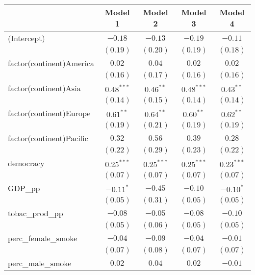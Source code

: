 
\begin{table}[!h]
\begin{center}
\begin{tabular}{l c c c c }
\toprule
 & Model 1 & Model 2 & Model 3 & Model 4 \\
\midrule
(Intercept)              & $-0.18$      & $-0.13$      & $-0.19$      & $-0.11$      \\
                         & $(0.19)$     & $(0.20)$     & $(0.19)$     & $(0.18)$     \\
factor(continent)America & $0.02$       & $0.04$       & $0.02$       & $0.02$       \\
                         & $(0.16)$     & $(0.17)$     & $(0.16)$     & $(0.16)$     \\
factor(continent)Asia    & $0.48^{***}$ & $0.46^{**}$  & $0.48^{***}$ & $0.43^{**}$  \\
                         & $(0.14)$     & $(0.15)$     & $(0.14)$     & $(0.14)$     \\
factor(continent)Europe  & $0.61^{**}$  & $0.64^{**}$  & $0.60^{**}$  & $0.62^{**}$  \\
                         & $(0.19)$     & $(0.21)$     & $(0.19)$     & $(0.19)$     \\
factor(continent)Pacific & $0.32$       & $0.56$       & $0.39$       & $0.28$       \\
                         & $(0.22)$     & $(0.29)$     & $(0.23)$     & $(0.22)$     \\
democracy                & $0.25^{***}$ & $0.25^{***}$ & $0.25^{***}$ & $0.23^{***}$ \\
                         & $(0.07)$     & $(0.07)$     & $(0.07)$     & $(0.07)$     \\
GDP\_pp                  & $-0.11^{*}$  & $-0.45$      & $-0.10$      & $-0.10^{*}$  \\
                         & $(0.05)$     & $(0.31)$     & $(0.05)$     & $(0.05)$     \\
tobac\_prod\_pp          & $-0.08$      & $-0.05$      & $-0.08$      & $-0.10$      \\
                         & $(0.05)$     & $(0.06)$     & $(0.05)$     & $(0.05)$     \\
perc\_female\_smoke      & $-0.04$      & $-0.09$      & $-0.04$      & $-0.01$      \\
                         & $(0.07)$     & $(0.08)$     & $(0.07)$     & $(0.07)$     \\
perc\_male\_smoke        & $0.02$       & $0.04$       & $0.02$       & $-0.01$      \\

\end{tabular}
\end{center}
\end{table}
